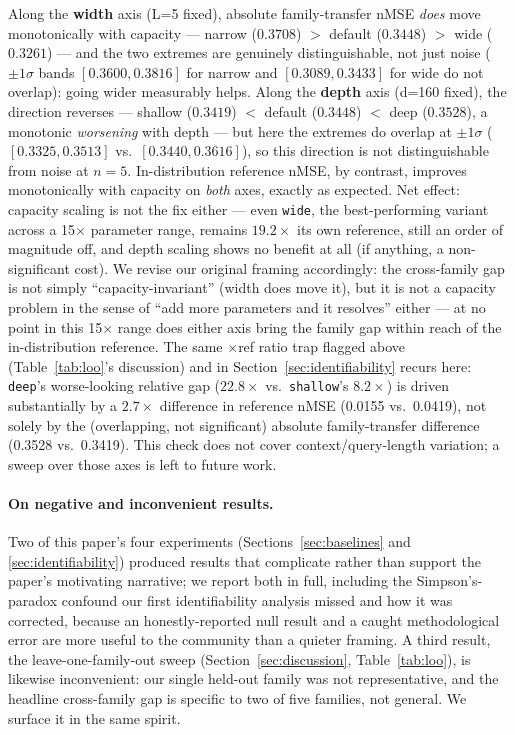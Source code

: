 \documentclass{article}
\begin{document}
Along the \textbf{width} axis (L=5 fixed), absolute family-transfer nMSE
\emph{does} move monotonically with capacity --- narrow ($0.3708$) $>$ default
($0.3448$) $>$ wide ($0.3261$) --- and the two extremes are genuinely
distinguishable, not just noise ($\pm1\sigma$ bands $[0.3600,0.3816]$ for
narrow and $[0.3089,0.3433]$ for wide do not overlap): going wider measurably
helps. Along the \textbf{depth} axis (d=160 fixed), the direction reverses ---
shallow ($0.3419$) $<$ default ($0.3448$) $<$ deep ($0.3528$), a monotonic
\emph{worsening} with depth --- but here the extremes do overlap at
$\pm1\sigma$ ($[0.3325,0.3513]$ vs.\ $[0.3440,0.3616]$), so this direction is
not distinguishable from noise at $n=5$. In-distribution reference nMSE, by
contrast, improves monotonically with capacity on \emph{both} axes, exactly as
expected. Net effect: capacity scaling is not the fix either --- even
\texttt{wide}, the best-performing variant across a 15$\times$ parameter
range, remains $19.2\times$ its own reference, still an order of magnitude
off, and depth scaling shows no benefit at all (if anything, a
non-significant cost). We revise our original framing accordingly: the
cross-family gap is not simply ``capacity-invariant'' (width does move it),
but it is not a capacity problem in the sense of ``add more parameters and
it resolves'' either --- at no point in this 15$\times$ range does either
axis bring the family gap within reach of the in-distribution reference. The
same $\times$ref ratio trap flagged above (Table~\ref{tab:loo}'s
discussion) and in Section~\ref{sec:identifiability} recurs here:
\texttt{deep}'s worse-looking relative gap ($22.8\times$ vs.\
\texttt{shallow}'s $8.2\times$) is driven substantially by a $2.7\times$
difference in reference nMSE (0.0155 vs.\ 0.0419), not solely by the
(overlapping, not significant) absolute family-transfer difference
(0.3528 vs.\ 0.3419). This check does not cover context/query-length
variation; a sweep over those axes is left to future work.

\paragraph{On negative and inconvenient results.} Two of this paper's four
experiments (Sections~\ref{sec:baselines} and \ref{sec:identifiability})
produced results that complicate rather than support the paper's motivating
narrative; we report both in full, including the Simpson's-paradox confound
our first identifiability analysis missed and how it was corrected, because
an honestly-reported null result and a caught methodological error are more
useful to the community than a quieter framing. A third result, the
leave-one-family-out sweep (Section~\ref{sec:discussion}, Table~\ref{tab:loo}),
is likewise inconvenient: our single held-out family was not representative,
and the headline cross-family gap is specific to two of five families, not
general. We surface it in the same spirit.
\end{document}
